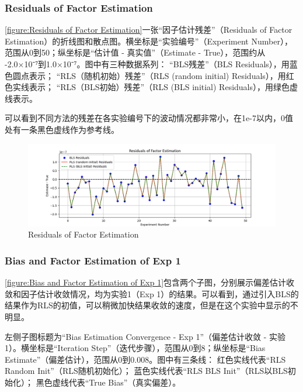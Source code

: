 \documentclass[openany,12pt,UTF8]{ctexart}
\begin{document}
\subsubsection{Residuals of Factor Estimation}
\autoref{figure:Residuals of Factor Estimation}一张“因子估计残差”（Residuals of Factor Estimation）的折线图和散点图。横坐标是“实验编号”（Experiment Number），范围从0到50；纵坐标是“估计值 - 真实值”（Estimate - True），范围约从 -2.0×10⁻⁷到1.0×10⁻⁷。图中有三种数据系列：
“BLS残差”（BLS Residuals），用蓝色圆点表示；
“RLS（随机初始）残差”（RLS (random initial) Residuals），用红色实线表示；
“RLS（BLS初始）残差”（RLS (BLS initial) Residuals），用绿色虚线表示。

可以看到不同方法的残差在各实验编号下的波动情况都非常小，在1e-7以内，0值处有一条黑色虚线作为参考线。 
\begin{figure}[h]\centering
    \includegraphics[width=\columnwidth]{figures/Residuals of Factor Estimation.png}
    \caption{Residuals of Factor Estimation}
    \label{figure:Residuals of Factor Estimation}
\end{figure}

\subsubsection{Bias and Factor Estimation of Exp 1}
\autoref{figure:Bias and Factor Estimation of Exp 1}包含两个子图，分别展示偏差估计收敛和因子估计收敛情况，均为实验1（Exp 1）的结果。可以看到，通过引入BLS的结果作为RLS的初值，可以稍微加快结果收敛的速度，但是在这个实验中显示的不明显。

左侧子图标题为“Bias Estimation Convergence - Exp 1”（偏差估计收敛 - 实验1）。横坐标是“Iteration Step”（迭代步骤），范围从0到8；纵坐标是“Bias Estimate”（偏差估计），范围从0到0.008。图中有三条线：
红色实线代表“RLS Random Init”（RLS随机初始化）；
蓝色实线代表“RLS BLS Init”（RLS以BLS初始化）；
黑色虚线代表“True Bias”（真实偏差）。
\end{document}
